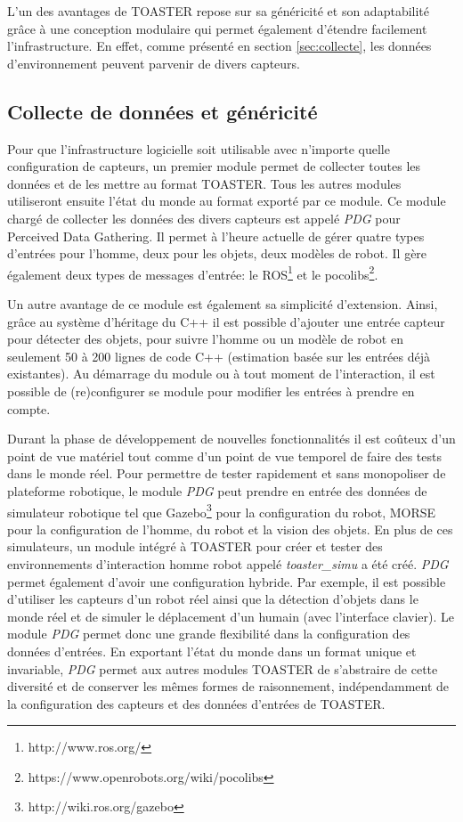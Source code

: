 \documentclass[a4paper,11pt,twoside]{StyleThese}
\begin{document}
L'un des avantages de TOASTER repose sur sa généricité et son adaptabilité grâce à une conception modulaire qui permet également d'étendre facilement l'infrastructure. En effet, comme présenté en section \ref{sec:collecte}, les données d'environnement peuvent parvenir de divers capteurs.

\subsection{Collecte de données et généricité}
\label{sec:PDG}
Pour que l'infrastructure logicielle soit utilisable avec n'importe quelle configuration de capteurs, un premier module permet de collecter toutes les données et de les mettre au format TOASTER. Tous les autres modules utiliseront ensuite l'état du monde au format exporté par ce module. Ce module chargé de collecter les données des divers capteurs est appelé \textit{PDG} pour Perceived Data Gathering.
Il permet à l'heure actuelle de gérer quatre types d'entrées pour l'homme, deux pour les objets, deux modèles de robot. Il gère également deux types de messages d'entrée: le ROS\footnote{http://www.ros.org/} et le pocolibs\footnote{https://www.openrobots.org/wiki/pocolibs}.

Un autre avantage de ce module est également sa simplicité d'extension. Ainsi, grâce au système d'héritage du C++ il est possible d'ajouter une entrée capteur pour détecter des objets, pour suivre l'homme ou un modèle de robot en seulement 50 à 200 lignes de code C++ (estimation basée sur les entrées déjà existantes).
Au démarrage du module ou à tout moment de l'interaction, il est possible de (re)configurer se module pour modifier les entrées à prendre en compte.

Durant la phase de développement de nouvelles fonctionnalités il est coûteux d'un point de vue matériel tout comme d'un point de vue temporel de faire des tests dans le monde réel. Pour permettre de tester rapidement et sans monopoliser de plateforme robotique, le module \textit{PDG} peut prendre en entrée des données de simulateur robotique tel que Gazebo\footnote{http://wiki.ros.org/gazebo} pour la configuration du robot, MORSE\cite{echeverria11} pour la configuration de l'homme, du robot et la vision des objets. En plus de ces simulateurs, un module intégré à TOASTER pour créer et tester des environnements d'interaction homme robot appelé \textit{toaster\_simu} a été créé. \textit{PDG} permet également d'avoir une configuration hybride.
Par exemple, il est possible d'utiliser les capteurs d'un robot réel ainsi que la détection d'objets dans le monde réel et de simuler le déplacement d'un humain (avec l'interface clavier).
Le module \textit{PDG} permet donc une grande flexibilité dans la configuration des données d'entrées. En exportant l'état du monde dans un format unique et invariable, \textit{PDG} permet aux autres modules TOASTER de s'abstraire de cette diversité et de conserver les mêmes formes de raisonnement, indépendamment de la configuration des capteurs et des données d'entrées de TOASTER.
\end{document}
